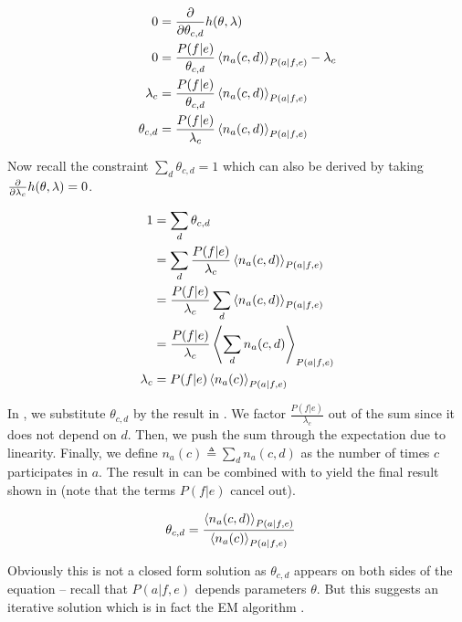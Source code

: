 \begin{align}
0 &= \sidepartial{h(\theta, \lambda)}{\theta_{c,d}}  \\
0 &= \frac{P(f|e)}{\theta_{c,d}} \expec{n_a(c,d)}{P(a|f,e)} - \lambda_c\\
\lambda_c &= \frac{P(f|e)}{\theta_{c,d}} \expec{n_a(c,d)}{P(a|f,e)}\\
\theta_{c,d} &= \frac{P(f|e)}{\lambda_c} \expec{n_a(c,d)}{P(a|f,e)} \label{eq:ThetaAsFuncOfLambda}
\end{align}

Now recall the constraint $\sum_d \theta_{c,d} = 1$ which can also be derived by taking $\sidepartial{h(\theta, \lambda)}{\lambda_c} = 0$. 

\begin{align}
1 &= \sum_d \theta_{c,d} \\
  &= \sum_d \frac{P(f|e)}{\lambda_c} \expec{n_a(c,d)}{P(a|f,e)} \label{eq:SubstTheta}\\
  &= \frac{P(f|e)}{\lambda_c} \sum_d \expec{n_a(c,d)}{P(a|f,e)} \\
  &= \frac{P(f|e)}{\lambda_c} \expec{\sum_d n_a(c,d)}{P(a|f,e)} \\
\lambda_c &= P(f|e) \expec{n_a(c)}{P(a|f,e)} \label{eq:FinalLambdaC}
\end{align}

In , we substitute $\theta_{c,d}$ by the result in .
We factor $\frac{P(f|e)}{\lambda_c}$ out of the sum since it does not depend on $d$.
Then, we push the sum through the expectation due to linearity.
Finally, we define $n_a(c) \triangleq \sum_d n_a(c,d)$ as the number of times $c$ participates in $a$.
The result in  can be combined with  to yield the final result shown in  (note that the terms $P(f|e)$ cancel out).

\begin{align}\label{eq:IBM1EM}
\theta_{c,d} &= \frac{\expec{n_a(c,d)}{P(a|f,e)}}{\expec{n_a(c)}{P(a|f,e)}} 
\end{align}

Obviously this is not a closed form solution as $\theta_{c,d}$ appears on both sides of the equation -- recall that $P(a|f,e)$ depends parameters $\theta$.
But this suggests an iterative solution which is in fact the EM algorithm \citep{Dempster+77:EM}.

